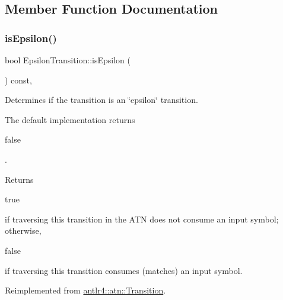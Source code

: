 \subsection{Member Function Documentation}
\mbox{\label{classantlr4_1_1atn_1_1EpsilonTransition_aa2ed63d1d7605293c69cd812c6e374ec}} 
\subsubsection{\texorpdfstring{is\+Epsilon()}{isEpsilon()}}
{\footnotesize\ttfamily bool Epsilon\+Transition\+::is\+Epsilon (\begin{DoxyParamCaption}{ }\end{DoxyParamCaption}) const\hspace{0.3cm}{\ttfamily [override]}, {\ttfamily [virtual]}}

Determines if the transition is an \char`\"{}epsilon\char`\"{} transition.

The default implementation returns
\begin{DoxyCode}
\textcolor{keyword}{false} 
\end{DoxyCode}
 .

\begin{DoxyReturn}{Returns}

\begin{DoxyCode}
\textcolor{keyword}{true} 
\end{DoxyCode}
 if traversing this transition in the A\+TN does not consume an input symbol; otherwise,
\begin{DoxyCode}
\textcolor{keyword}{false} 
\end{DoxyCode}
 if traversing this transition consumes (matches) an input symbol. 
\end{DoxyReturn}


Reimplemented from \hyperlink{classantlr4_1_1atn_1_1Transition_a8e712c7a46586d73c054c56f481b1be7}{antlr4\+::atn\+::\+Transition}.

\mbox{\label{classantlr4_1_1atn_1_1EpsilonTransition_adb67e8063ffad68fe759b105547f38c7}} 
